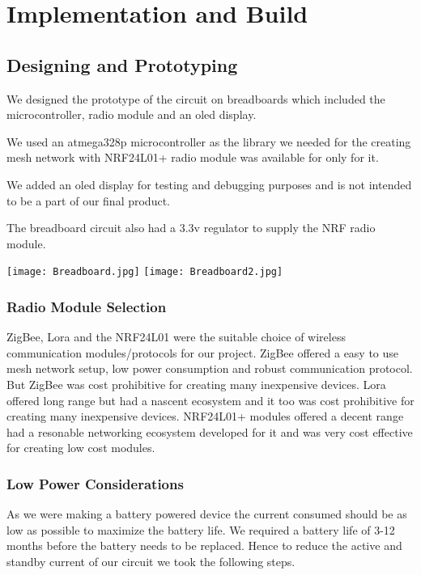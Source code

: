 \chapter{Implementation and Build}

\section{Designing and Prototyping}
We designed the prototype of the circuit on breadboards which included the microcontroller, radio module and an oled display.

We used an atmega328p microcontroller as the library we needed for the creating mesh network with NRF24L01+ radio module was available for only for it.

We added an oled display for testing and debugging purposes and is not intended to be a part of our final product.

The breadboard circuit also had a 3.3v regulator to supply the NRF radio module. 
\begin{center}
	\texttt{[image: Breadboard.jpg]}
	\texttt{[image: Breadboard2.jpg]}
\end{center}


\subsection{Radio Module Selection}
ZigBee, Lora and the NRF24L01 were the suitable choice of wireless communication modules/protocols for our project.
ZigBee offered a easy to use mesh network setup, low power consumption and robust communication protocol. But ZigBee was cost prohibitive for creating many inexpensive devices. 
Lora offered long range but had a nascent ecosystem and it too was cost prohibitive for creating many inexpensive devices. 
NRF24L01+ modules offered a decent range had a resonable networking ecosystem developed for it and was very cost effective for creating low cost modules.


\subsection{Low Power Considerations}
As we were making a battery powered device the current consumed should be as low as possible to maximize the battery life.
We required a battery life of 3-12 months before the battery needs to be replaced. Hence to reduce the active and standby current of our circuit we took the following steps.


